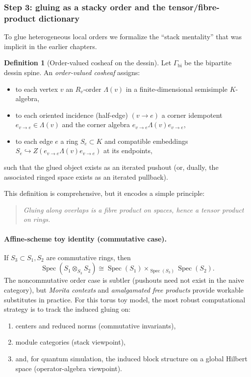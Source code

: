 \documentclass[11pt,oneside]{amsbook}
\numberwithin{equation}{section}
\theoremstyle{plain}
\theoremstyle{definition}
\newtheorem{definition}[theorem]{Definition}
\theoremstyle{remark}
\DeclareMathOperator{\Spec}{\mathrm{Spec}}
\begin{document}
\subsubsection{Step 3: gluing as a stacky order and the tensor/fibre-product dictionary}

To glue heterogeneous local orders we formalize the ``stack mentality'' that was implicit in the earlier chapters.

\begin{definition}[Order-valued cosheaf on the dessin]
\label{def:order_cosheaf}
Let $\Gamma_{\mathrm{bi}}$ be the bipartite dessin spine.
An \emph{order-valued cosheaf} assigns:
\begin{itemize}
\item to each vertex $v$ an $R_v$-order $\Lambda(v)$ in a finite-dimensional semisimple $K$-algebra,
\item to each oriented incidence (half-edge) $(v\to e)$ a corner idempotent $e_{v\to e}\in \Lambda(v)$ and the corner algebra $e_{v\to e}\Lambda(v)e_{v\to e}$,
\item to each edge $e$ a ring $S_e\subset K$ and compatible embeddings $S_e\hookrightarrow Z(e_{v\to e}\Lambda(v)e_{v\to e})$ at its endpoints,
\end{itemize}
such that the glued object exists as an iterated pushout (or, dually, the associated ringed space exists as an iterated pullback).
\end{definition}

This definition is comprehensive, but it encodes a simple principle:

\begin{quote}
\emph{Gluing along overlaps is a fibre product on spaces, hence a tensor product on rings.}
\end{quote}

\paragraph{Affine-scheme toy identity (commutative case).}
If $S_3\subset S_1,S_2$ are commutative rings, then
\[
\Spec(S_1\otimes_{S_3}S_2)\cong \Spec(S_1)\times_{\Spec(S_3)}\Spec(S_2).
\]
The noncommutative order case is subtler (pushouts need not exist in the naive category), but \emph{Morita contexts} and \emph{amalgamated free products} provide workable substitutes in practice.
For this torus toy model, the most robust computational strategy is to track the induced gluing on:
\begin{enumerate}[label=(\alph*)]
\item centers and reduced norms (commutative invariants),
\item module categories (stack viewpoint),
\item and, for quantum simulation, the induced block structure on a global Hilbert space (operator-algebra viewpoint).
\end{enumerate}
\end{document}
